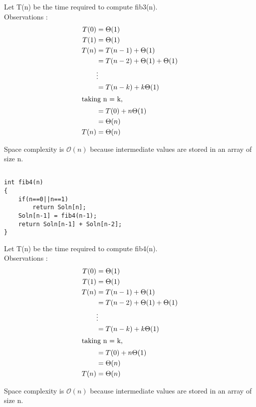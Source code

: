 \documentclass{article}
\begin{document}
Let T(n) be the time required to compute fib3(n). \\
Observations : \\
\begin{align*}
T(0) & = \Theta(1) \\
T(1) & = \Theta(1) \\
T(n) & = T(n-1) + \Theta(1) \\
& = T(n-2) + \Theta(1) + \Theta(1) \\
& \vdots \\
& = T(n-k) + k\Theta(1) \\
\intertext{taking n = k,}
& = T(0) + n\Theta(1) \\
& = \Theta(n) \\
T(n) & = \Theta(n)\\
\end{align*}

Space complexity is $\mathcal{O}(n)$ because intermediate values are stored in an array of size n.

\newpage
\subsection{}
\begin{lstlisting}
int fib4(n)
{
	if(n==0||n==1)
		return Soln[n];
	Soln[n-1] = fib4(n-1); 
	return Soln[n-1] + Soln[n-2];
}
\end{lstlisting}

Let T(n) be the time required to compute fib4(n). \\
Observations : \\
\begin{align*}
T(0) & = \Theta(1) \\
T(1) & = \Theta(1) \\
T(n) & = T(n-1) + \Theta(1) \\
& = T(n-2) + \Theta(1) + \Theta(1) \\
& \vdots \\
& = T(n-k) + k\Theta(1) \\
\intertext{taking n = k,}
& = T(0) + n\Theta(1) \\
& = \Theta(n) \\
T(n) & = \Theta(n)\\
\end{align*}

Space complexity is $\mathcal{O}(n)$ because intermediate values are stored in an array of size n.
\end{document}
